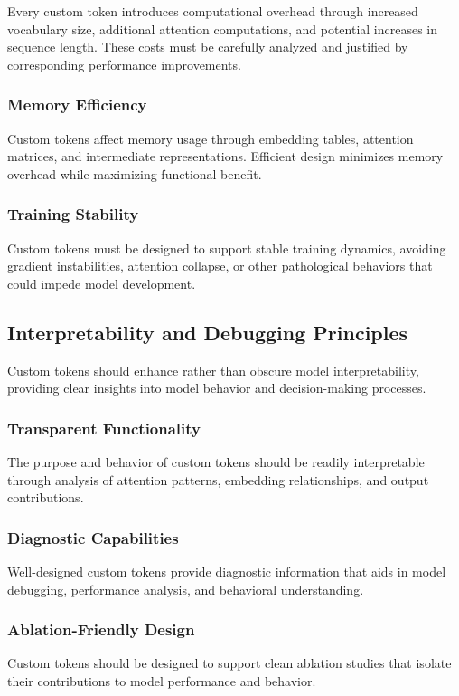 Every custom token introduces computational overhead through increased vocabulary size, additional attention computations, and potential increases in sequence length. These costs must be carefully analyzed and justified by corresponding performance improvements.

\subsubsection{Memory Efficiency}

Custom tokens affect memory usage through embedding tables, attention matrices, and intermediate representations. Efficient design minimizes memory overhead while maximizing functional benefit.

\subsubsection{Training Stability}

Custom tokens must be designed to support stable training dynamics, avoiding gradient instabilities, attention collapse, or other pathological behaviors that could impede model development.

\subsection{Interpretability and Debugging Principles}

Custom tokens should enhance rather than obscure model interpretability, providing clear insights into model behavior and decision-making processes.

\subsubsection{Transparent Functionality}

The purpose and behavior of custom tokens should be readily interpretable through analysis of attention patterns, embedding relationships, and output contributions.

\subsubsection{Diagnostic Capabilities}

Well-designed custom tokens provide diagnostic information that aids in model debugging, performance analysis, and behavioral understanding.
\begin{comment}
Feedback: This is a great point. An example would make it more concrete. "For instance, if you design a `<TOOL_USE>` token, you can analyze its attention patterns to see exactly which parts of the input text the model considered relevant when it decided to call a specific tool. This provides a powerful debugging and interpretability signal."
\end{comment}

\subsubsection{Ablation-Friendly Design}

Custom tokens should be designed to support clean ablation studies that isolate their contributions to model performance and behavior.


